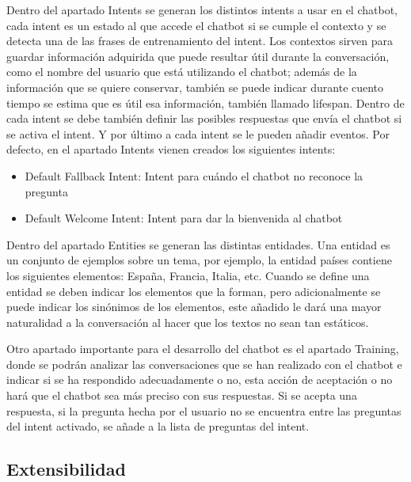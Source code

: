 Dentro del apartado Intents se generan los distintos intents a usar en el chatbot, cada intent es un estado al que accede el chatbot si se cumple el contexto y se detecta una de las frases de entrenamiento del intent. Los contextos sirven para guardar información adquirida que puede resultar útil durante la conversación, como el nombre del usuario que está utilizando el chatbot; además de la información que se quiere conservar, también se puede indicar durante cuento tiempo se estima que es útil esa información, también llamado lifespan. Dentro de cada intent se debe también definir las posibles respuestas que envía el chatbot si se activa el intent. Y por último a cada intent se le pueden añadir eventos. Por defecto, en el apartado Intents vienen creados los siguientes intents:

\begin{itemize}
\item Default Fallback Intent: Intent para cuándo el chatbot no reconoce la pregunta
\item Default Welcome Intent: Intent para dar la bienvenida al chatbot
\end{itemize}

Dentro del apartado Entities se generan las distintas entidades. Una entidad es un conjunto de ejemplos sobre un tema, por ejemplo, la entidad países contiene los siguientes elementos: España, Francia, Italia, etc. Cuando se define una entidad se deben indicar los elementos que la forman, pero adicionalmente se puede indicar los sinónimos de los elementos, este añadido le dará una mayor naturalidad a la conversación al hacer que los textos no sean tan estáticos.

Otro apartado importante para el desarrollo del chatbot es el apartado Training, donde se podrán analizar las conversaciones que se han realizado con el chatbot e indicar si se ha respondido adecuadamente o no, esta acción de aceptación o no hará que el chatbot sea más preciso con sus respuestas. Si se acepta una respuesta, si la pregunta hecha por el usuario no se encuentra entre las preguntas del intent activado, se añade a la lista de preguntas del intent.

\subsection*{Extensibilidad}

